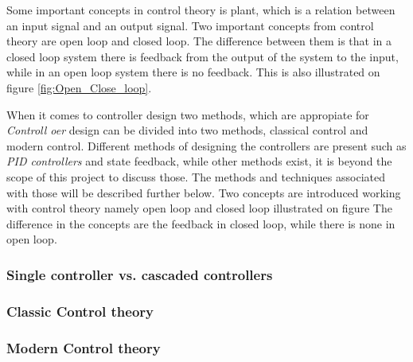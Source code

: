 \documentclass[../../main.tex]{subfiles}
\begin{document}
Some important concepts in control theory is plant, which is a relation between an input signal and an output signal.  
Two important concepts from control theory are open loop and closed loop. The difference between them is that in a closed loop system there is feedback from the output of the system to the input, while in an open loop system there is no feedback. This is also illustrated on figure \ref{fig:Open_Close_loop}.


When it comes to controller design two methods, which are appropiate for
\textit{Controll oer} design can be divided into two methods, classical control and modern control. Different methods of designing the controllers are present such as \textit{PID controllers} and state feedback, while other methods exist, it is beyond the scope of this project to discuss those. The methods and techniques associated with those will be described further below. Two concepts are introduced working with control theory namely open loop and closed loop illustrated on figure  The difference in the concepts are the feedback in closed loop, while there is none in open loop.


\subsubsection*{Single controller vs. cascaded controllers}

\subsubsection*{Classic Control theory}

\subsubsection*{Modern Control theory}

\end{document}
